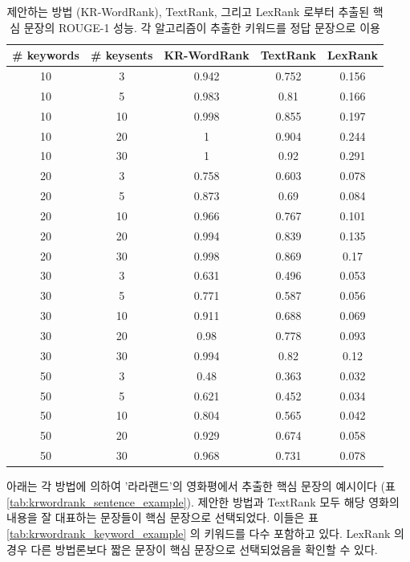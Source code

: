 \documentclass[11pt]{article}
\begin{document}
\begin{table}[H]
\centering
\small
\label{tab:krwordrank_sentence_performance}
\caption{제안하는 방법 (KR-WordRank), TextRank, 그리고 LexRank 로부터 추출된 핵심 문장의 ROUGE-1 성능. 각 알고리즘이 추출한 키워드를 정답 문장으로 이용}
\begin{tabular}{|c|c|c|c|c|}
\hline
\textbf{\# keywords} & \textbf{\# keysents} & \textbf{KR-WordRank} & \textbf{TextRank} & \textbf{LexRank} \\ \hline
10 & 3 & 0.942 & 0.752 & 0.156 \\ \hline
10 & 5 & 0.983 & 0.81 & 0.166 \\ \hline
10 & 10 & 0.998 & 0.855 & 0.197 \\ \hline
10 & 20 & 1 & 0.904 & 0.244 \\ \hline
10 & 30 & 1 & 0.92 & 0.291 \\ \hline
20 & 3 & 0.758 & 0.603 & 0.078 \\ \hline
20 & 5 & 0.873 & 0.69 & 0.084 \\ \hline
20 & 10 & 0.966 & 0.767 & 0.101 \\ \hline
20 & 20 & 0.994 & 0.839 & 0.135 \\ \hline
20 & 30 & 0.998 & 0.869 & 0.17 \\ \hline
30 & 3 & 0.631 & 0.496 & 0.053 \\ \hline
30 & 5 & 0.771 & 0.587 & 0.056 \\ \hline
30 & 10 & 0.911 & 0.688 & 0.069 \\ \hline
30 & 20 & 0.98 & 0.778 & 0.093 \\ \hline
30 & 30 & 0.994 & 0.82 & 0.12 \\ \hline
50 & 3 & 0.48 & 0.363 & 0.032 \\ \hline
50 & 5 & 0.621 & 0.452 & 0.034 \\ \hline
50 & 10 & 0.804 & 0.565 & 0.042 \\ \hline
50 & 20 & 0.929 & 0.674 & 0.058 \\ \hline
50 & 30 & 0.968 & 0.731 & 0.078 \\ \hline
\end{tabular}
\end{table}

아래는 각 방법에 의하여 '라라랜드'의 영화평에서 추출한 핵심 문장의 예시이다 (표 \ref{tab:krwordrank_sentence_example}).
제안한 방법과 TextRank 모두 해당 영화의 내용을 잘 대표하는 문장들이 핵심 문장으로 선택되었다.
이들은 표 \ref{tab:krwordrank_keyword_example} 의 키워드를 다수 포함하고 있다.
LexRank 의 경우 다른 방법론보다 짧은 문장이 핵심 문장으로 선택되었음을 확인할 수 있다.
\end{document}

